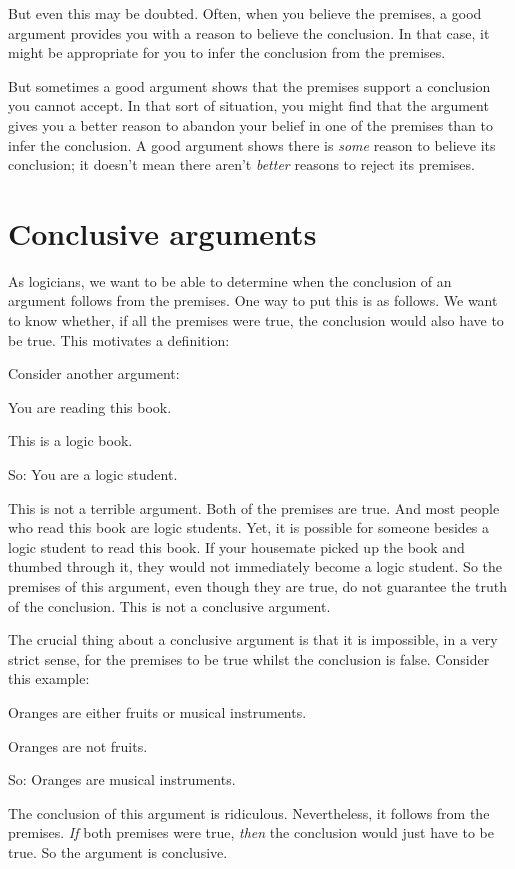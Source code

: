 But even this may be doubted. Often, when you believe the premises, a good argument provides you with a reason to believe the conclusion. In that case, it might be appropriate for you to infer the conclusion from the premises.

But sometimes a good argument shows that the premises support a conclusion you cannot accept. In that sort of situation, you might find that the argument gives you a better reason to abandon your belief in one of the premises than to infer the conclusion. A good argument shows there is \emph{some} reason to believe its conclusion; it doesn't mean there aren't \emph{better} reasons to reject its premises. 


\section{Conclusive arguments} \label{s:conclusiveargs}
As logicians, we want to be able to determine when the conclusion of an argument follows from the premises. One way to put this is as follows. We want to know whether, if all the premises were true, the conclusion would also have to be true. This motivates a definition:



Consider another argument:
	\begin{earg}
		\item[] You are reading this book.
		\item[] This is a logic book.
		\item[So:] You are a logic student.
	\end{earg}
This is not a terrible argument. Both of the premises are true. And most people who read this book are logic students. Yet, it is possible for someone besides a logic student to read this book. If your housemate picked up the book and thumbed through it, they would not immediately become a logic student. So the premises of this argument, even though they are true, do not guarantee the truth of the conclusion. This is not a conclusive argument. 

The crucial thing about a conclusive argument is that it is impossible, in a very strict sense, for the premises to be true whilst the conclusion is false. Consider this example:
	\begin{earg}
		\item[] Oranges are either fruits or musical instruments.
		\item[] Oranges are not fruits.
		\item[So:] Oranges are musical instruments.
	\end{earg}
The conclusion of this argument is ridiculous. Nevertheless, it follows from the premises. \emph{If} both premises were true, \emph{then} the conclusion would just have to be true. So the argument is conclusive. 


